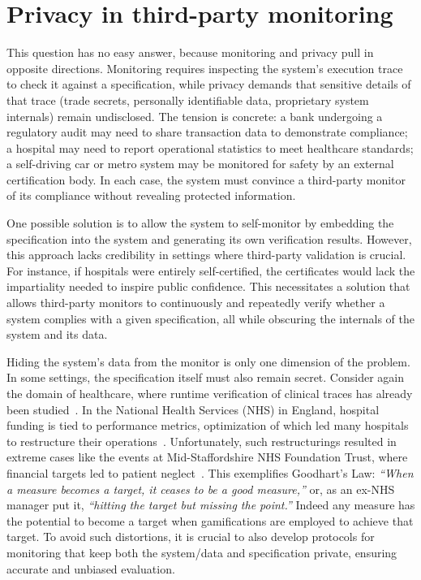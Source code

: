 \section{Privacy in third-party monitoring}

This question has no easy answer, because monitoring and privacy pull in opposite directions.
Monitoring requires inspecting the system's execution trace to check it against a specification, while privacy demands that sensitive details of that trace (trade secrets, personally identifiable data, proprietary system internals) remain undisclosed.
The tension is concrete: a bank undergoing a regulatory audit may need to share transaction data to demonstrate compliance; a hospital may need to report operational statistics to meet healthcare standards; a self-driving car or metro system may be monitored for safety by an external certification body.
In each case, the system must convince a third-party monitor of its compliance without revealing protected information.

One possible solution is to allow the system to self-monitor by embedding the specification into the system and generating its own verification results. However, this approach lacks credibility in settings where third-party validation is crucial. For instance, if hospitals were entirely self-certified, the certificates would lack the impartiality needed to inspire public confidence.
This necessitates a solution that allows third-party monitors to continuously and repeatedly verify whether a system complies with a given specification, all while obscuring the internals of the system and its data.

Hiding the system's data from the monitor is only one dimension of the problem.
In some settings, the specification itself must also remain secret.
Consider again the domain of healthcare, where runtime verification of clinical traces has already been studied~\cite{JLKWHSS16}.
In the National Health Services (NHS) in England, hospital funding is tied to performance metrics, optimization of which led many hospitals to restructure their operations~\cite{Cra17,Mea14}. Unfortunately, such restructurings resulted in extreme cases like the events at Mid-Staffordshire NHS Foundation Trust, where financial targets led to patient neglect~\cite{mid2013report}. This exemplifies Goodhart's Law: \emph{``When a measure becomes a target, it ceases to be a good measure,''} or, as an ex-NHS manager put it, \emph{``hitting the target but missing the point.''} Indeed any measure has the potential to become a target when gamifications are employed to achieve that target.
To avoid such distortions, it is crucial to also develop protocols for monitoring that keep both the system/data and specification private, ensuring accurate and unbiased evaluation.

